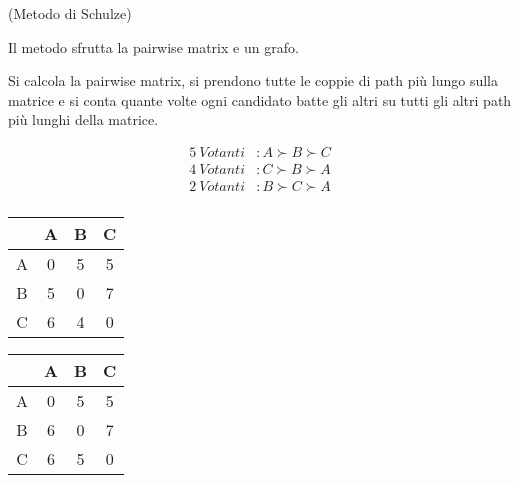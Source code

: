 \begin{esempio}
    (Metodo di Schulze)

    Il metodo sfrutta la pairwise matrix e un grafo. 

    Si calcola la pairwise matrix, si prendono tutte le coppie di path più lungo sulla matrice e si conta quante volte ogni candidato batte
    gli altri su tutti gli altri path più lunghi della matrice.

    \begin{equation}
        \begin{aligned}
            5 \ Votanti &: A \succ B \succ C \\
            4 \ Votanti &: C \succ B \succ A \\
            2 \ Votanti &: B \succ C \succ A \\
        \end{aligned}
    \end{equation}

    \begin{table}[H]
        \centering
        \begin{tabular}{|c|c|c|c|}
            \hline
            & A & B & C \\
            \hline
            A & 0 & 5 & 5 \\
            \hline
            B &5 & 0 & 7 \\
            \hline
            C & 6 & 4 & 0 \\
            \hline
        \end{tabular}
    \end{table}

    \begin{figure}[H]
        \centering
    \end{figure}

    \begin{table}[H]
        \centering
        \begin{tabular}{|c|c|c|c|}
            \hline
            & A & B & C \\
            \hline
            A & 0 & 5 & 5 \\
            \hline
            B &6 & 0 & 7 \\
            \hline
            C & 6 & 5 & 0 \\
            \hline
        \end{tabular}
    \end{table}
\end{esempio}

\newpage
